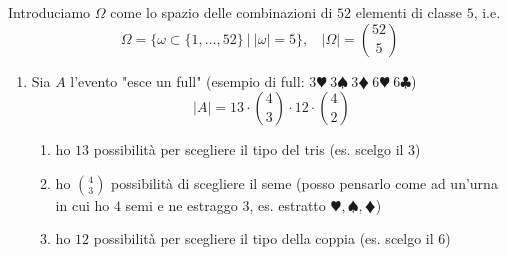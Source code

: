 Introduciamo $\Omega $ come lo spazio delle combinazioni di $52$ elementi di classe $5$, i.e.
\begin{equation*}
\Omega =\{\omega \subset \{1,\dots ,52\} \ |\ | \omega | =5\} ,\ \ \ \ | \Omega | =\binom{52}{5}
\end{equation*}
\begin{enumerate}
\item Sia $A$ l'evento "esce un full" (esempio di full: $3\varheartsuit \ 3\spadesuit \ 3\vardiamondsuit \ 6\varheartsuit \ 6\clubsuit $)\begin{equation*}
| A| =13\cdot \binom{4}{3} \cdot 12\cdot \binom{4}{2}
\end{equation*}
\begin{enumerate}
\item ho $13$ possibilità per scegliere il tipo del tris (es. scelgo il $3$)
\item ho $\binom{4}{3}$ possibilità di scegliere il seme (posso pensarlo come ad un'urna in cui ho $4$ semi e ne estraggo $3$, es. estratto $\varheartsuit ,\spadesuit ,\vardiamondsuit $)
\item ho $12$ possibilità per scegliere il tipo della coppia (es. scelgo il $6$)


\end{enumerate}
\end{enumerate}

